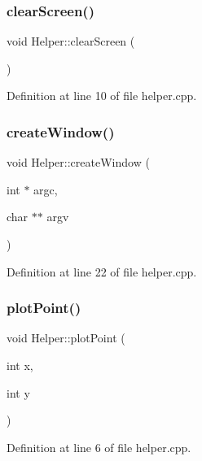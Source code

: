 \subsubsection{\texorpdfstring{clear\+Screen()}{clearScreen()}}
{\footnotesize\ttfamily void Helper\+::clear\+Screen (\begin{DoxyParamCaption}{ }\end{DoxyParamCaption})\hspace{0.3cm}{\ttfamily [static]}}



Definition at line 10 of file helper.\+cpp.

\mbox{\label{class_helper_a0c737a761fc0e355cfbab843904b805b}} 
\subsubsection{\texorpdfstring{create\+Window()}{createWindow()}}
{\footnotesize\ttfamily void Helper\+::create\+Window (\begin{DoxyParamCaption}\item[{int $\ast$}]{argc,  }\item[{char $\ast$$\ast$}]{argv }\end{DoxyParamCaption})\hspace{0.3cm}{\ttfamily [static]}}



Definition at line 22 of file helper.\+cpp.

\mbox{\label{class_helper_adb93a220e5cadac68b1ef3f3ca36ecfe}} 
\subsubsection{\texorpdfstring{plot\+Point()}{plotPoint()}}
{\footnotesize\ttfamily void Helper\+::plot\+Point (\begin{DoxyParamCaption}\item[{int}]{x,  }\item[{int}]{y }\end{DoxyParamCaption})\hspace{0.3cm}{\ttfamily [static]}}



Definition at line 6 of file helper.\+cpp.




